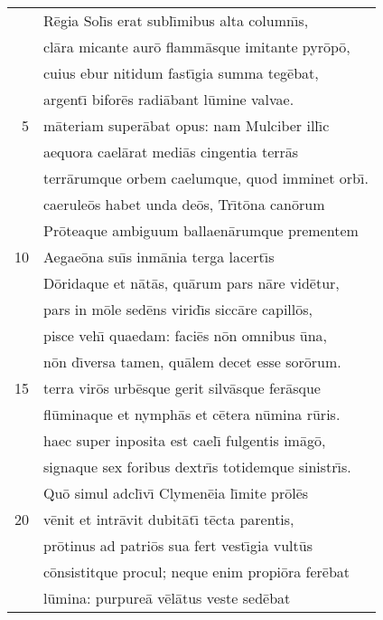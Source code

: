 \documentclass[paper=6in:9in,pagesize=pdftex,
               headinclude=on,footinclude=on,12pt]{scrbook}
\begin{document}

\begin{longtable}[p]{ r l }
 & \indent R\=egia Sol\={\i}s erat subl\={\i}mibus alta column\={\i}s,\\ 
 & cl\=ara micante aur\=o flamm\=asque imitante pyr\=op\=o,\\ 
 & cuius ebur nitidum fast\={\i}gia summa teg\=ebat,\\ 
 & argent\={\i} bifor\=es radi\=abant l\=umine valvae.\\ 
5 & m\=ateriam super\=abat opus: nam Mulciber ill\={\i}c\\ 
 & aequora cael\=arat medi\=as cingentia terr\=as\\ 
 & terr\=arumque orbem caelumque, quod imminet orb\={\i}.\\ 
 & caerule\=os habet unda de\=os, Tr\={\i}t\=ona can\=orum\\ 
 & Pr\=oteaque ambiguum ballaen\=arumque prementem\\ 
10 & Aegae\=ona su\={\i}s inm\=ania terga lacert\={\i}s\\ 
 & D\=oridaque et n\=at\=as, qu\=arum pars n\=are vid\=etur,\\ 
 & pars in m\=ole sed\=ens virid\={\i}s sicc\=are capill\=os,\\ 
 & pisce veh\={\i} quaedam: faci\=es n\=on omnibus \=una,\\ 
 & n\=on d\={\i}versa tamen, qu\=alem decet esse sor\=orum.\\ 
15 & terra vir\=os urb\=esque gerit silv\=asque fer\=asque\\ 
 & fl\=uminaque et nymph\=as et c\=etera n\=umina r\=uris.\\ 
 & haec super inposita est cael\={\i} fulgentis im\=ag\=o,\\ 
 & signaque sex foribus dextr\={\i}s totidemque sinistr\={\i}s.\\ 
 & \indent Qu\=o simul adcl\={\i}v\={\i} Clymen\=eia l\={\i}mite pr\=ol\=es\\ 
20 & v\=enit et intr\=avit dubit\=at\={\i} t\=ecta parentis,\\ 
 & pr\=otinus ad patri\=os sua fert vest\={\i}gia vult\=us\\ 
 & c\=onsistitque procul; neque enim propi\=ora fer\=ebat\\ 
 & l\=umina: purpure\=a v\=el\=atus veste sed\=ebat\\ 

\end{longtable}
\end{document}
